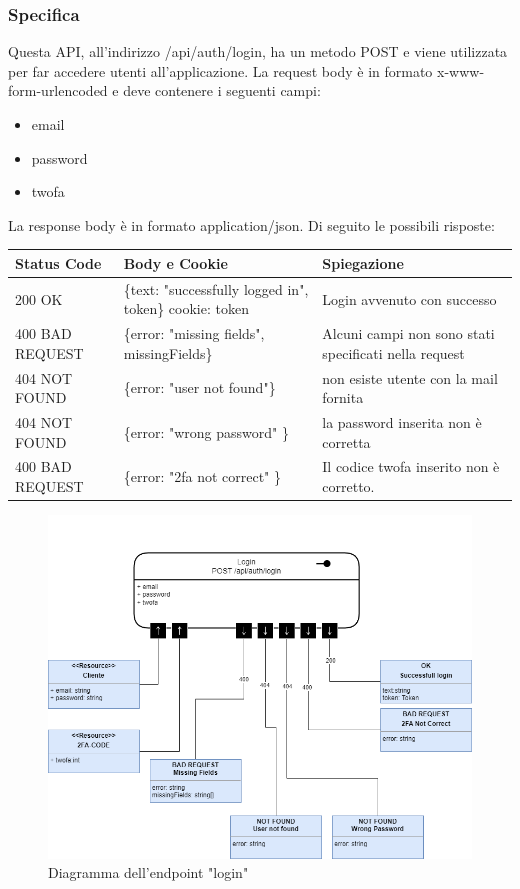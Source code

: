 \documentclass{report}
\begin{document}
\subsubsection*{Specifica}
Questa API, all'indirizzo /api/auth/login, ha un metodo POST e viene utilizzata per far accedere utenti all'applicazione.
La request body è in formato x-www-form-urlencoded e deve contenere i seguenti campi:
\begin{itemize}
	\item email
	\item password
	\item twofa
\end{itemize}
La response body è in formato application/json. Di seguito le possibili risposte:
\begin{center} %
	\centering
	\begin{tabular}{ |p{4cm}|p{5cm}|p{4cm}| }
		\hline
		\centering Status Code & \qquad\quad Body e Cookie & \qquad\qquad Spiegazione\\ %
		\hline
		200 OK & \{text: "successfully logged in", token\} cookie: token & Login avvenuto con successo 	\\
		\hline
		400 BAD REQUEST & \{error: "missing fields", missingFields\} & Alcuni campi non sono stati specificati nella request\\ %
		\hline
		404 NOT FOUND & \{error: "user not found"\} & non esiste utente con la mail fornita \\%
		\hline
		404 NOT FOUND & \{error: "wrong password" \} & la password inserita non è corretta \\
		\hline
		400 BAD REQUEST & \{error: "2fa not correct" \} & Il codice twofa inserito non è corretto. \\
		\hline
	\end{tabular}
\end{center}
\begin{figure}[H]
	\centering\includegraphics[width=1\textwidth]{images/microservizio-autenticazione/diagrams/diagramma_login.drawio.png}
	\caption{Diagramma dell'endpoint "login"}
\end{figure}
\end{document}
